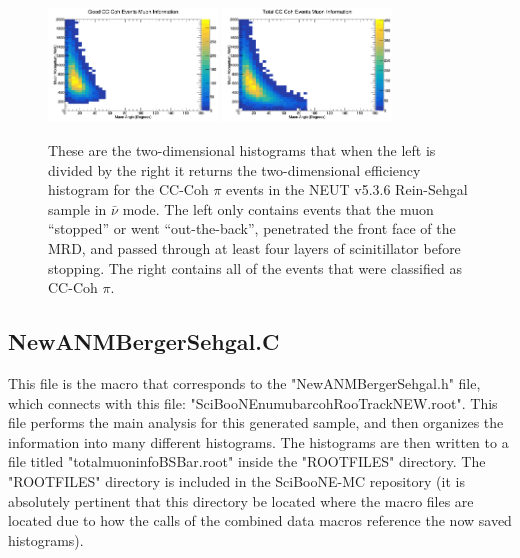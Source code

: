 \documentclass[11pt]{article}
\begin{document}
\begin{figure}[H]
\centering
\includegraphics[width=0.4\textwidth]{NewANMReinSehgalImages/7.png}
\includegraphics[width=0.4\textwidth]{NewANMReinSehgalImages/8.png}
\caption{These are the two-dimensional histograms that when the left is divided by the right it returns the two-dimensional efficiency histogram for the CC-Coh $\pi$ events in the NEUT v5.3.6 Rein-Sehgal sample in $\bar{\nu}$ mode. The left only contains events that the muon ``stopped'' or went ``out-the-back'', penetrated the front face of the MRD, and passed through at least four layers of scinitillator before stopping. The right contains all of the events that were classified as CC-Coh $\pi$.}
\label{fig:app:ANMCCCohMuon2DRS}
\end{figure}


\subsection{NewANMBergerSehgal.C}
\label{sub:NewANMBergerSehgal.C}
This file is the macro that corresponds to the "NewANMBergerSehgal.h" file, which connects with this file: "SciBooNE\textunderscore numubar\textunderscore coh\textunderscore RooTrack\textunderscore NEW.root". This file performs the main analysis for this generated sample, and then organizes the information into many different histograms. The histograms are then written to a file titled "totalmuoninfoBSBar.root" inside the "ROOTFILES" directory. The "ROOTFILES" directory is included in the SciBooNE-MC repository (it is absolutely pertinent that this directory be located where the macro files are located due to how the calls of the combined data macros reference the now saved histograms).
\end{document}
